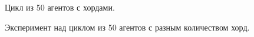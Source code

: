 \documentclass[a4paper,article,14pt]{extarticle}
\begin{document}
\begin{figure}[H]
\begin{center}
\caption{
\label{fig:cycle50}
    Цикл из 50 агентов с хордами.}
\end{center}
\end{figure}



\begin{figure}[H]
\begin{center}
\caption{
\label{fig:cycle50agents}
     Эксперимент над циклом из 50 агентов с разным количеством хорд.}
\end{center}
\end{figure}
\end{document}
